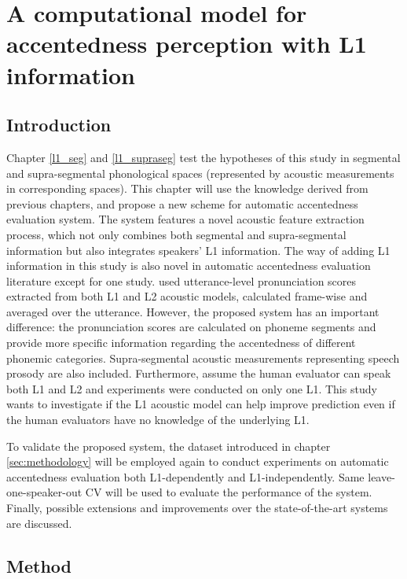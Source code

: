 \chapter{A computational model for accentedness perception with L1 information}
\label{both_l1_l2}

\section{Introduction}

Chapter \ref{l1_seg} and \ref{l1_supraseg} test the hypotheses of this study in segmental and supra-segmental phonological spaces (represented by acoustic measurements in corresponding spaces). This chapter will use the knowledge derived from previous chapters, and propose a new scheme for automatic accentedness evaluation system. The system features a novel acoustic feature extraction process, which not only combines both segmental and supra-segmental information but also integrates speakers' L1 information. The way of adding L1 information in this study is also novel in automatic accentedness evaluation literature except for one study. \cite{moustroufas2007automatic} used utterance-level pronunciation scores extracted from both L1 and L2 acoustic models, calculated frame-wise and averaged over the utterance. However, the proposed system has an important difference: the pronunciation scores are calculated on phoneme segments and provide more specific information regarding the accentedness of different phonemic categories. Supra-segmental acoustic measurements representing speech prosody are also included. Furthermore, \cite{moustroufas2007automatic} assume the human evaluator can speak both L1 and L2 and experiments were conducted on only one L1. This study wants to investigate if the L1 acoustic model can help improve prediction even if the human evaluators have no knowledge of the underlying L1.

To validate the proposed system, the dataset introduced in chapter \ref{sec:methodology} will be employed again to conduct experiments on automatic accentedness evaluation both L1-dependently and L1-independently. Same leave-one-speaker-out CV will be used to evaluate the performance of the system. Finally, possible extensions and improvements over the state-of-the-art systems are discussed.

\section{Method}

